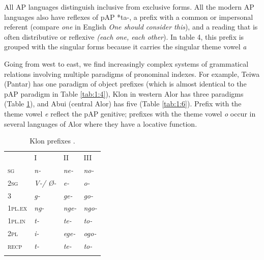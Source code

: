 {All AP languages distinguish inclusive from exclusive forms. All the modern AP languages also have reflexes of pAP *ta-, a prefix with a common or impersonal referent (compare \textit{one} in English \textit{One should consider this}), and a reading that is often distributive or reflexive \textit{(each one, each other}). In table 4, this prefix is grouped with the singular forms because it carries the singular theme vowel \textit{a}

Going from west to east, we find increasingly complex systems of grammatical relations involving multiple paradigms of pronominal indexes. For example, Teiwa (Pantar) has one paradigm of object prefixes (which is almost identical to the pAP paradigm in Table \ref{tab:1:4}), Klon in western Alor has three paradigms (Table \ref{tab:1:5}), and Abui (central Alor) has five (Table \ref{tab:1:6}). Prefix with the theme vowel \textit{e} reflect the pAP genitive;  prefixes with the theme vowel \textit{o} occur in several languages of Alor where they have a locative function.



\begin{table}\centering
\begin{tabular}{llll} & I & II & III\\
\mytoprule
1\textsc{sg} & {\itshape n-} & {\itshape ne-} & {\itshape no-}\\
2\textsc{sg} & {\itshape V-/ {\O}-} & {\itshape e-} & {\itshape o-}\\
3 & {\itshape g-} & {\itshape ge-} & {\itshape go-}\\
{\scshape 1pl.ex} & {\itshape ng-} & {\itshape nge-} & {\itshape ngo-}\\
{\scshape 1pl.in} & {\itshape t-} & {\itshape te-} & {\itshape to-}\\
{\scshape 2pl} & {\itshape i-} & {\itshape ege-} & {\itshape ogo-}\\
{\scshape recp} & {\itshape t-} & {\itshape te-} & {\itshape to-}\\
\mybottomrule
\end{tabular}
\caption{Klon prefixes \citep[69,39]{Baird2008}.}
\label{tab:1:5}
\end{table}

 


}
